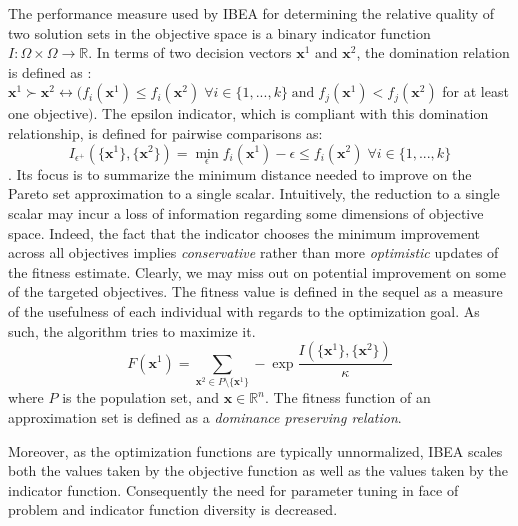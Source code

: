 \documentclass{sig-alternate}
\begin{document}
The performance measure used by IBEA for determining the relative quality of two solution sets in the objective space is a binary indicator function $I: \Omega \times \Omega \rightarrow \mathbb{R}$. 
In terms of two decision vectors $\bm{x}^1$ and $\bm{x}^2$,  the domination relation is defined as : $\bm{x}^1 \succ \bm{x}^2 \leftrightarrow ( f_i(\bm{x}^1) \leq f_i(\bm{x}^2) \; \forall i \in \{1, ..., k\} \;\text{and}\; f_j(\bm{x}^1) < f_j(\bm{x}^2)$ for at least one objective$)$. 
The epsilon indicator, which is compliant with this domination relationship, is defined for pairwise comparisons as: $$I_{\epsilon^+} (\{\bm{x}^1\}, \{\bm{x}^2\}) = \min_\epsilon f_i(\bm{x}^1) - \epsilon \leq f_i(\bm{x}^2) \; \forall i \in \{1, ..., k\}$$. 
Its focus is to summarize the minimum distance needed to improve on the Pareto set approximation to a single scalar. 
Intuitively, the reduction to a single scalar may incur a  loss of information regarding some dimensions of objective space. Indeed, the fact that the indicator chooses the minimum improvement across all objectives implies \emph{conservative} rather than more \emph{optimistic} updates of the fitness estimate. Clearly, we may miss out on potential improvement on some of the targeted objectives. The fitness value is defined in the sequel as a measure of the usefulness of each individual with regards to the optimization goal. As such, the algorithm tries to maximize it.
$$ F(\bm{x}^1) = \sum_{\bm{x}^2 \in P \setminus \{\bm{x}^1\}} - \exp{\frac{I(\{\bm{x}^1\}, \{\bm{x}^2\})}{\kappa}}$$ where $P$ is the population set, and $\bm{x} \in \mathbb{R}^n$. The fitness function of an approximation set is defined as a \emph{dominance preserving relation}.

Moreover, as the optimization functions are typically unnormalized, IBEA scales both the values taken by the objective function as well as the values taken by the indicator function. Consequently the need for parameter tuning in face of problem and indicator function diversity is decreased.
\end{document}
